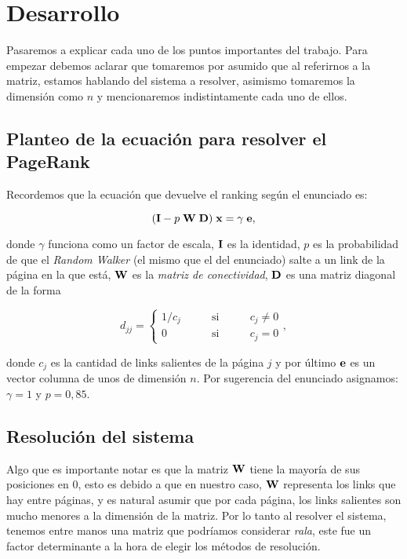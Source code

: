 \section{Desarrollo}

Pasaremos a explicar cada uno de los puntos importantes del trabajo. Para empezar debemos aclarar que tomaremos por asumido que al referirnos a la matriz, estamos hablando del sistema a resolver, asimismo tomaremos la dimensión como $n$ y mencionaremos indistintamente cada uno de ellos.

\subsection{Planteo de la ecuación para resolver el PageRank}

Recordemos que la ecuación que devuelve el ranking según el enunciado es:

\begin{equation*}
(\mI - p \; \mW \; \mD) \; \vx = \gamma \; \ve,
\label{eq:pr2}
\end{equation*}

donde $\gamma$ funciona como un factor de escala, ${\bf I}$ es la identidad, $p$ es la probabilidad de que el \emph{Random Walker} (el mismo que el del enunciado) salte a un link de la página en la que está, ${\bf W}$ es la \emph{matriz de conectividad}, ${\bf D}$ es una matriz diagonal de la forma

\begin{equation*}
d_{jj} = \left\lbrace
\begin{array}{lcl}
1/c_j & \qquad \text{si} \qquad & c_j \neq 0 \\
0 & \qquad \text{si} \qquad & c_j = 0
\end{array}
\right. ,
\end{equation*}

donde $c_j$ es la cantidad de links salientes de la página $j$ y por último ${\bf e}$ es un vector columna de unos de dimensión $n$. Por sugerencia del enunciado asignamos: $\gamma = 1$ y $p = 0,85$.

\subsection{Resolución del sistema}

Algo que es importante notar es que la matriz ${\bf W}$ tiene la mayoría de sus posiciones en $0$, esto es debido a que en nuestro caso, ${\bf W}$ representa los links que hay entre páginas, y es natural asumir que por cada página, los links salientes son mucho menores a la dimensión de la matriz. Por lo tanto al resolver el sistema, tenemos entre manos una matriz que podríamos considerar \emph{rala}, este fue un factor determinante a la hora de elegir los métodos de resolución.


